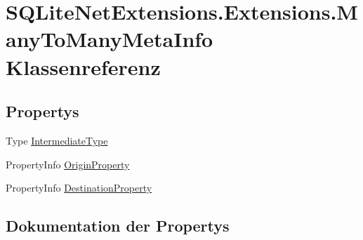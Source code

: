 \hypertarget{class_s_q_lite_net_extensions_1_1_extensions_1_1_many_to_many_meta_info}{}\section{S\+Q\+Lite\+Net\+Extensions.\+Extensions.\+Many\+To\+Many\+Meta\+Info Klassenreferenz}
\label{class_s_q_lite_net_extensions_1_1_extensions_1_1_many_to_many_meta_info}
\subsection*{Propertys}
\begin{DoxyCompactItemize}
\item 
Type \mbox{\hyperlink{class_s_q_lite_net_extensions_1_1_extensions_1_1_many_to_many_meta_info_addac6754252cc5d8ddd79676aed73000}{Intermediate\+Type}}
\item 
Property\+Info \mbox{\hyperlink{class_s_q_lite_net_extensions_1_1_extensions_1_1_many_to_many_meta_info_a2a71eb0c2e3ae9335e1fff84494ac34a}{Origin\+Property}}
\item 
Property\+Info \mbox{\hyperlink{class_s_q_lite_net_extensions_1_1_extensions_1_1_many_to_many_meta_info_aecb9912e2e3809b868d4d109a01e8a4b}{Destination\+Property}}
\end{DoxyCompactItemize}


\subsection{Dokumentation der Propertys}
\mbox{\label{class_s_q_lite_net_extensions_1_1_extensions_1_1_many_to_many_meta_info_aecb9912e2e3809b868d4d109a01e8a4b}} 
